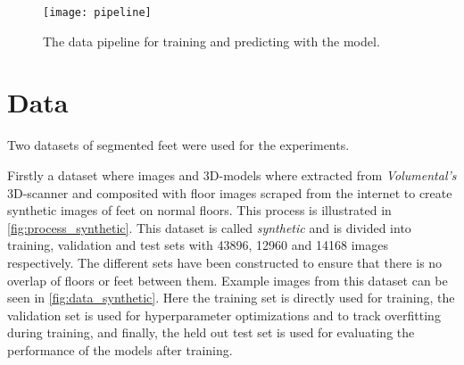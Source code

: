 \documentclass{kththesis}
\begin{document}
\begin{figure}[h]
  \centering
  \texttt{[image: pipeline]}
  \caption{The data pipeline for training and predicting with the model.}
  \label{fig:pipeline}
\end{figure}

\section{Data}
Two datasets of segmented feet were used for the experiments.

Firstly a dataset where images and 3D-models where extracted from
\textit{Volumental's}
3D-scanner and composited with floor images scraped from the internet to create
synthetic images of feet on normal floors. This process is illustrated in \cref{fig:process_synthetic}.
This dataset is called
\textit{synthetic} and is divided into training, validation and test sets with
43896, 12960 and 14168 images respectively. The different sets have been
constructed to ensure that there is no overlap of floors or feet between them.
Example images from this dataset can be seen in \cref{fig:data_synthetic}. Here
the training set is directly used for training, the validation set is used for
hyperparameter optimizations and to track overfitting during training, and
finally, the held out test set is used for evaluating the performance of the
models after training.
\end{document}

